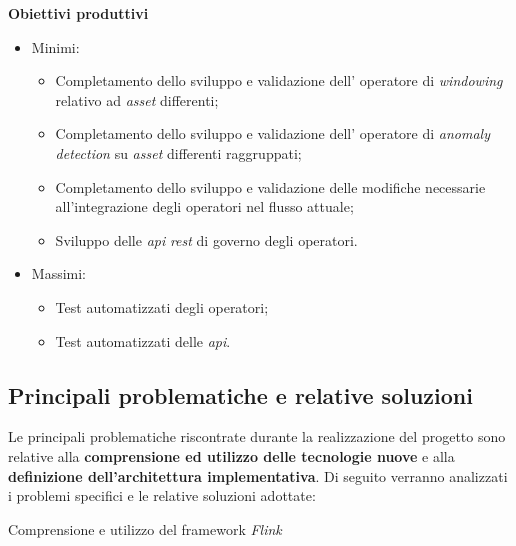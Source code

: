 \noindent \textbf{Obiettivi produttivi}
\begin{itemize}
	\item{Minimi:
		\begin{itemize}
			\item{Completamento dello sviluppo e validazione dell' operatore di \textit{windowing} relativo ad \textit{asset} differenti;}
			\item{Completamento dello sviluppo e validazione dell' operatore di \textit{anomaly detection} su \textit{asset} differenti raggruppati;}
			\item{Completamento dello sviluppo e validazione delle modifiche necessarie all'integrazione degli operatori nel flusso attuale;}
			\item{Sviluppo delle \textit{\gls{api}} \textit{\gls{rest}} di governo degli operatori.}
		\end{itemize}			
	}
	\item{Massimi:
		\begin{itemize}
			\item{Test automatizzati degli operatori;}
			\item{Test automatizzati delle \textit{\gls{api}}.}
		\end{itemize}			
	}
\end{itemize}

\subsection{Principali problematiche e relative soluzioni}
Le principali problematiche riscontrate durante la realizzazione del progetto sono relative alla \textbf{comprensione ed utilizzo delle tecnologie nuove} e alla \textbf{definizione dell'architettura implementativa}. Di seguito verranno analizzati i problemi specifici e le relative soluzioni adottate:\\

\begin{risk}{Comprensione e utilizzo del framework \textit{Flink}}
    \label{risk:flinkImport}
\end{risk}

